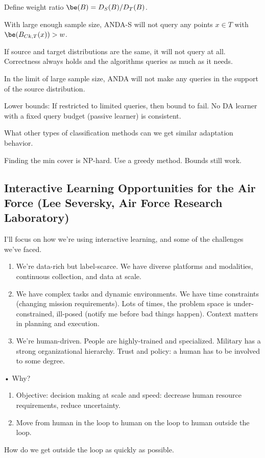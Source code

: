 Define weight ratio $\be(B)=D_S(B)/D_T(B)$. 

With large enough sample size, ANDA-S will not query any points $x\in T$ with $\be(B_{Ck,T}(x))>w$. %

If source and target distributions are the same, it will not query at all.
Correctness always holds and the algorithms queries as much as it needs. 

In the limit of large sample size, ANDA will not make any queries in the support of the source distribution.

Lower bounds: If restricted to limited queries, then bound to fail. No DA learner with a fixed query budget (passive learner) is consistent.

What other types of classification methods can we get similar adaptation behavior.


Finding the min cover is NP-hard. Use a greedy method. Bounds still work.

\subsection{Interactive Learning Opportunities for the Air Force (Lee Seversky, Air Force Research Laboratory)}

I'll focus on how we're using interactive learning, and some of the challenges we've faced.

\begin{enumerate}
\item
We're data-rich but label-scarce.  We have diverse platforms and modalities, continuous collection, and data at scale.
\item
We have complex tasks and dynamic environments. We have time constraints (changing mission requirements). Lots of times, the problem space is under-constrained, ill-posed (notify me before bad things happen). Context matters in planning and execution.
\item
We're human-driven. People are highly-trained and specialized.
Military has a strong organizational hierarchy. 
Trust and policy: a human has to be involved to some degree.
\end{enumerate}•
Why?
\begin{enumerate}
\item
Objective: decision making at scale and speed: decrease human resource requirements, reduce uncertainty.
\item
Move from human in the loop to human on the loop to human outside the loop.
\end{enumerate}
How do we get outside the loop as quickly as possible.

